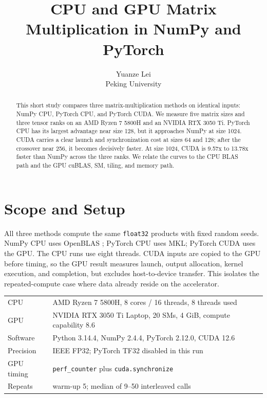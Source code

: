 \documentclass{article}
\title{CPU and GPU Matrix Multiplication in NumPy and PyTorch}
\author{%
  Yuanze Lei \quad 2510124204\\
  Peking University
}
\begin{document}
\maketitle

\begin{abstract}
This short study compares three matrix-multiplication methods on identical
inputs: NumPy CPU, PyTorch CPU, and PyTorch CUDA. We measure five matrix sizes
and three tensor ranks on an AMD Ryzen 7 5800H and an NVIDIA RTX 3050 Ti.
PyTorch CPU has its largest advantage near size 128, but it approaches NumPy at
size 1024. CUDA carries a clear launch and synchronization cost at sizes 64 and
128; after the crossover near 256, it becomes decisively faster. At size 1024,
CUDA is 9.57x to 13.78x faster than NumPy across the three ranks. We relate the
curves to the CPU BLAS path and the GPU cuBLAS, SM, tiling, and memory path.
\end{abstract}

\section{Scope and Setup}\label{sec:scope}

All three methods compute the same \texttt{float32} products with fixed random
seeds. NumPy CPU \citep{harris2020numpy} uses OpenBLAS \citep{openblas};
PyTorch CPU \citep{paszke2019pytorch} uses MKL; PyTorch CUDA uses the GPU. The
CPU runs use eight threads. CUDA inputs are copied to the GPU before timing, so
the GPU result measures launch, output allocation, kernel execution, and
completion, but excludes host-to-device transfer. This isolates the
repeated-compute case where data already reside on the accelerator.

\begin{center}
\label{tab:environment}
\small
\begin{tabularx}{\linewidth}{@{}lX@{}}
\toprule
CPU & AMD Ryzen 7 5800H, 8 cores / 16 threads, 8 threads used \\
GPU & NVIDIA RTX 3050 Ti Laptop, 20 SMs, 4 GiB, compute capability 8.6 \\
Software & Python 3.14.4, NumPy 2.4.4, PyTorch 2.12.0, CUDA 12.6 \\
Precision & IEEE FP32; PyTorch TF32 disabled in this run \\
GPU timing & \texttt{perf\_counter} plus \texttt{cuda.synchronize} \\
Repeats & warm-up 5; median of 9--50 interleaved calls \\
\bottomrule
\end{tabularx}
\end{center}
\end{document}
